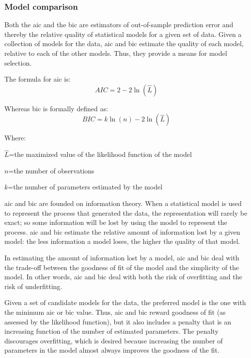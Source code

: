 \subsubsection{Model comparison}
Both the \gls{aic} and the \gls{bic} are estimators of out-of-sample prediction error and thereby the relative quality of statistical models for a given set of data.\cite{Akaike1974,Schwarz1978} Given a collection of models for the data, \gls{aic} and \gls{bic} estimate the quality of each model, relative to each of the other models. Thus, they provide a means for model selection.

The formula for \gls{aic} is:
\[AIC =  2-2\ln(\hat{L})\]

Whereas \gls{bic} is formally defined as:
\[BIC =  k\ln(n)-2\ln(\hat{L})\]

Where:
\begin{description}
	\item $\hat{L}$=the maximized value of the likelihood function of the model
	
	\item $n$=the number of observations
	
	\item $k$=the number of parameters estimated by the model
\end{description}

\gls{aic} and \gls{bic} are founded on information theory. When a statistical model is used to represent the process that generated the data, the representation will rarely be exact; so some information will be lost by using the model to represent the process. \gls{aic} and \gls{bic} estimate the relative amount of information lost by a given model: the less information a model loses, the higher the quality of that model.

In estimating the amount of information lost by a model, \gls{aic} and \gls{bic} deal with the trade-off between the goodness of fit of the model and the simplicity of the model. In other words, \gls{aic} and \gls{bic} deal with both the risk of overfitting and the risk of underfitting.

Given a set of candidate models for the data, the preferred model is the one with the minimum \gls{aic} or \gls{bic} value. Thus, \gls{aic} and \gls{bic} reward goodness of fit (as assessed by the likelihood function), but it also includes a penalty that is an increasing function of the number of estimated parameters. The penalty discourages overfitting, which is desired because increasing the number of parameters in the model almost always improves the goodness of the fit.

